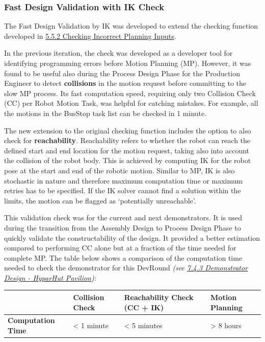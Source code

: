 \documentclass[11pt]{book}
\begin{document}
\subsubsection{Fast Design Validation with IK Check}

The Fast Design Validation by IK was developed to extend the checking function developed in \uline{5.5.2 Checking Incorrect Planning Inputs}. 

In the previous iteration, the check was developed as a developer tool for identifying programming errors before Motion Planning (MP). However, it was found to be useful also during the Process Design Phase for the Production Engineer to detect \textbf{collisions }in the motion request before committing to the slow MP process. Its fast computation speed, requiring only two Collision Check (CC) per Robot Motion Task, was helpful for catching mistakes. For example, all the motions in the BusStop task list can be checked in 1 minute. 

The new extension to the original checking function includes the option to also check for \textbf{reachability}. Reachability refers to whether the robot can reach the defined start and end location for the motion request, taking also into account the collision of the robot body. This is achieved by computing IK for the robot pose at the start and end of the robotic motion. Similar to MP, IK is also stochastic in nature and therefore maximum computation time or maximum retries has to be specified. If the IK solver cannot find a solution within the limits, the motion can be flagged as ‘potentially unreachable’.

This validation check was for the current and next demonstrators. It is used during the transition from the Assembly Design to Process Design Phase to quickly validate the constructability of the design. It provided a better estimation compared to performing CC alone but at a fraction of the time needed for complete MP. The table below shows a comparison of the computation time needed to check the demonstrator for this DevRound \textit{(see \uline{7.4.3 Demonstrator Design  - HyparHut Pavilion})}:

\begin{table}[H]
\begin{adjustbox}{max width=\textwidth}
\begin{tabular}{p{3.36cm}p{3.12cm}p{5.34cm}p{3.94cm}}
\hline
\multicolumn{1}{|p{3.36cm}}{} & 
\multicolumn{1}{|p{3.12cm}}{{\footnotesize \textbf{Collision Check}}} & 
\multicolumn{1}{|p{5.34cm}}{{\footnotesize \textbf{Reachability Check (CC + IK) }}} & 
\multicolumn{1}{|p{3.94cm}|}{{\footnotesize \textbf{Motion Planning}}} \\ 
\hline
\multicolumn{1}{|p{3.36cm}}{{\footnotesize \textbf{Computation Time}}} & 
\multicolumn{1}{|p{3.12cm}}{{\footnotesize < 1 minute}} & 
\multicolumn{1}{|p{5.34cm}}{{\footnotesize < 5 minutes}} & 
\multicolumn{1}{|p{3.94cm}|}{{\footnotesize > 8 hours}} \\ 
\hline
\end{tabular}
\end{adjustbox}
\end{table}
\vspace{2\baselineskip}
\end{document}

